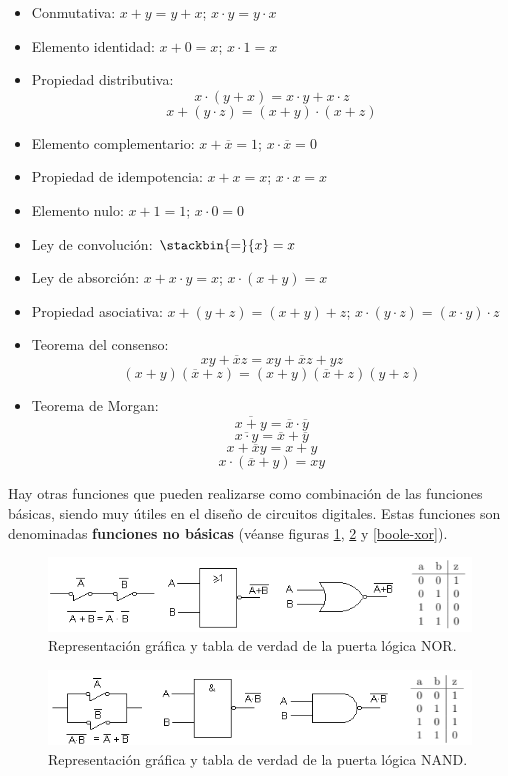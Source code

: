 \documentclass[a4paper, 11pt, titlepage]{article}
\begin{document}
    \begin{itemize}
      \item Conmutativa: $x+y=y+x$; $x\cdot y=y\cdot x$
      \item Elemento identidad: $x+0=x$; $x\cdot1=x$
      \item Propiedad distributiva: 
        \[x\cdot(y+x)=x\cdot y + x\cdot z\]
        \[x+(y\cdot z)=(x+y)\cdot(x+z)\]
      \item Elemento complementario: $x+\overline{x}=1$; $x\cdot\overline{x}=0$
      \item Propiedad de idempotencia: $x+x=x$; $x\cdot x=x$
      \item Elemento nulo: $x+1=1$; $x\cdot 0=0$
      \item Ley de convolución: $ \stackbin{=}{x}=x$
      \item Ley de absorción: $x+x\cdot y=x$; $x\cdot(x+y)=x$
      \item Propiedad asociativa: $x+(y+z)=(x+y)+z$; $x\cdot(y\cdot z)=(x\cdot y)\cdot z$
      \item Teorema del consenso:
        \[xy+\overline{x}z=xy+\overline{x}z+yz\]
        \[(x+y)(\overline{x}+z)=(x+y)(\overline{x}+z)(y+z)\] 
      \item Teorema de Morgan:
        \[\overline{x+y}=\overline{x}\cdot\overline{y}\]
        \[\overline{x\cdot y}=\overline{x}+\overline{y}\]
        \[x+\overline{x}y=x+y\]
        \[x\cdot(\overline{x}+y)=xy\]
    \end{itemize}

    Hay otras funciones que pueden realizarse como combinación de las funciones básicas, 
    siendo muy útiles en el diseño de circuitos digitales. Estas funciones son denominadas
    \textbf{funciones no básicas} (véanse figuras \ref{boole-nor}, \ref{boole-nand} y 
    \ref{boole-xor}).

    \begin{figure}[htp]
      \centering
      \includegraphics[width=1\textwidth]{resources/boole-nor.png}
      \caption{Representación gráfica y tabla de verdad de la puerta lógica NOR.}
      \label{boole-nor}
    \end{figure}

    \begin{figure}[htp]
      \centering
      \includegraphics[width=1\textwidth]{resources/boole-nand.png}
      \caption{Representación gráfica y tabla de verdad de la puerta lógica NAND.}
      \label{boole-nand}
    \end{figure}
\end{document}
